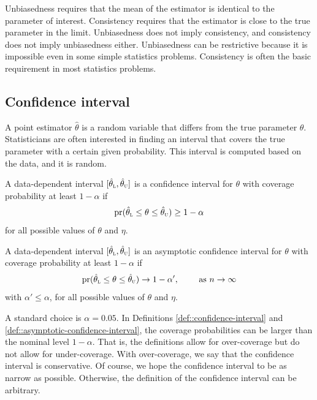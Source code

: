 Unbiasedness requires that the mean of the estimator is identical to the parameter of interest. Consistency requires that the estimator is close to the true parameter in the limit. Unbiasedness does not imply consistency, and consistency does not imply unbiasedness either. Unbiasedness can be restrictive because it is impossible even in some simple statistics problems. Consistency is often the basic requirement in most statistics problems. 





\subsection{Confidence interval}



A point estimator $\hat\theta$ is a random variable that differs from the true parameter $\theta$. Statisticians are often interested in finding an interval that covers the true parameter with a certain given probability. This interval is computed based on the data, and it is random. 

\begin{definition}
\label{def::confidence-interval}
A data-dependent interval $[  \hat\theta_\textsc{l} , \hat\theta_\textsc{u} ] $ is a confidence interval for $\theta$ with coverage probability at least $1-\alpha$ if
$$
\textup{pr}(    \hat\theta_\textsc{l}    \leq \theta \leq  \hat\theta_\textsc{u}  ) \geq 1-\alpha 
$$
for all possible values of $\theta$ and $\eta$.  
\end{definition}


\begin{definition}
\label{def::asymptotic-confidence-interval}
A data-dependent interval $[  \hat\theta_\textsc{l} , \hat\theta_\textsc{u} ] $ is an asymptotic confidence interval for $\theta$ with coverage probability at least $1-\alpha$ if
$$
\textup{pr}(    \hat\theta_\textsc{l}   \leq \theta \leq  \hat\theta_\textsc{u}  )   \rightarrow    1-\alpha'   ,\qquad \text{ as } n\rightarrow \infty
$$
with $\alpha '  \leq \alpha$, for all possible values of $\theta$ and $\eta$.     
\end{definition}


A standard choice is $\alpha = 0.05$. 
In Definitions \ref{def::confidence-interval} and \ref{def::asymptotic-confidence-interval}, the coverage probabilities can be larger than the nominal level $1-\alpha$. That is, the definitions allow for over-coverage but do not allow for under-coverage. With over-coverage, we say that the confidence interval is conservative. Of course, we hope the confidence interval to be as narrow as possible. Otherwise, the definition of the confidence interval can be arbitrary. 




